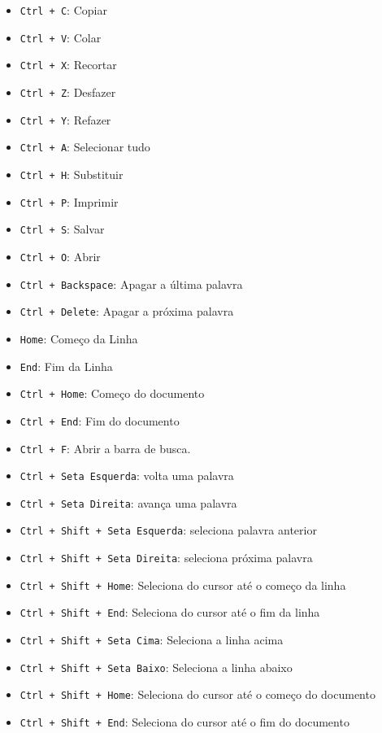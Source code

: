 \documentclass[a4paper, 12pt]{article}
\begin{document}
\begin{itemize}
	\item \texttt{Ctrl + C}: Copiar
	\item \texttt{Ctrl + V}: Colar
	\item \texttt{Ctrl + X}: Recortar
	\item \texttt{Ctrl + Z}: Desfazer
	\item \texttt{Ctrl + Y}: Refazer
	\item \texttt{Ctrl + A}: Selecionar tudo
    \item \texttt{Ctrl + H}: Substituir
    \item \texttt{Ctrl + P}: Imprimir
    \item \texttt{Ctrl + S}: Salvar
    \item \texttt{Ctrl + O}: Abrir
	\item \texttt{Ctrl + Backspace}: Apagar a última palavra
	\item \texttt{Ctrl + Delete}: Apagar a próxima palavra
	\item \texttt{Home}: Começo da Linha
	\item \texttt{End}: Fim da Linha
	\item \texttt{Ctrl + Home}: Começo do documento
	\item \texttt{Ctrl + End}: Fim do documento
	\item \texttt{Ctrl + F}: Abrir a barra de busca.
	\item \texttt{Ctrl + Seta Esquerda}: volta uma palavra
	\item \texttt{Ctrl + Seta Direita}: avança uma palavra
	\item \texttt{Ctrl + Shift + Seta Esquerda}: seleciona palavra anterior
	\item \texttt{Ctrl + Shift + Seta Direita}: seleciona próxima palavra
	\item \texttt{Ctrl + Shift + Home}: Seleciona do cursor até o começo da linha
	\item \texttt{Ctrl + Shift + End}: Seleciona do cursor até o fim da linha
	\item \texttt{Ctrl + Shift + Seta Cima}: Seleciona a linha acima
	\item \texttt{Ctrl + Shift + Seta Baixo}: Seleciona a linha abaixo
	\item \texttt{Ctrl + Shift + Home}: Seleciona do cursor até o começo do documento
	\item \texttt{Ctrl + Shift + End}: Seleciona do cursor até o fim do documento
\end{itemize}
\end{document}
